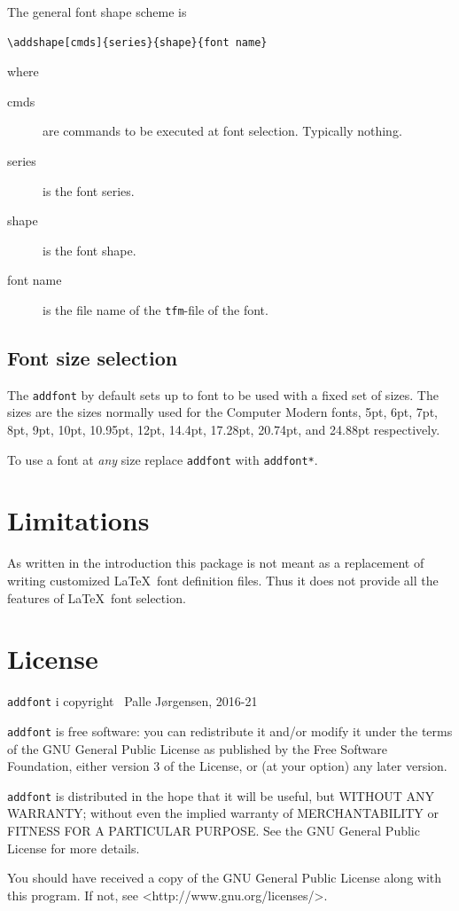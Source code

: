 \documentclass[12pt,british,parskip=half]{scrartcl}
\begin{document}
The general font shape scheme is
\begin{lstlisting}
\addshape[cmds]{series}{shape}{font name}
\end{lstlisting}

where 
\begin{description}
\item[cmds] are commands to be executed at font selection. Typically
  nothing.
\item[series] is the font series.
\item[shape] is the font shape.
\item[font name] is the file name of the \texttt{tfm}-file of the font.
\end{description}

\subsection{Font size selection}
\label{sec:font-size-selection}

The \lstinline|addfont| by default sets up to font to be used with a
fixed set of sizes. The sizes are the sizes normally used for the
Computer Modern fonts, 5pt, 6pt, 7pt, 8pt, 9pt, 10pt, 10.95pt, 12pt,
14.4pt, 17.28pt, 20.74pt, and 24.88pt respectively.

To use a font at \emph{any} size replace \lstinline|addfont| with
\lstinline|addfont*|.

\section{Limitations}
\label{sec:limitations}

As written in the introduction this package is not meant as a
replacement of writing customized \LaTeX\ font definition files. Thus
it does not provide all the features of \LaTeX\ font selection.

\section{License}
\label{sec:license}

\texttt{addfont} i copyright \textcopyright\ Palle Jørgensen,
2016-21

\texttt{addfont} is free software: you can redistribute it and/or
modify it under the terms of the GNU General Public License as
published by the Free Software Foundation, either version 3 of the
License, or (at your option) any later version.

\texttt{addfont} is distributed in the hope that it will be useful,
but WITHOUT ANY WARRANTY; without even the implied warranty of
MERCHANTABILITY or FITNESS FOR A PARTICULAR PURPOSE. See the GNU
General Public License for more details.

You should have received a copy of the GNU General Public License
along with this program. If not, see <http://www.gnu.org/licenses/>.
\end{document}
